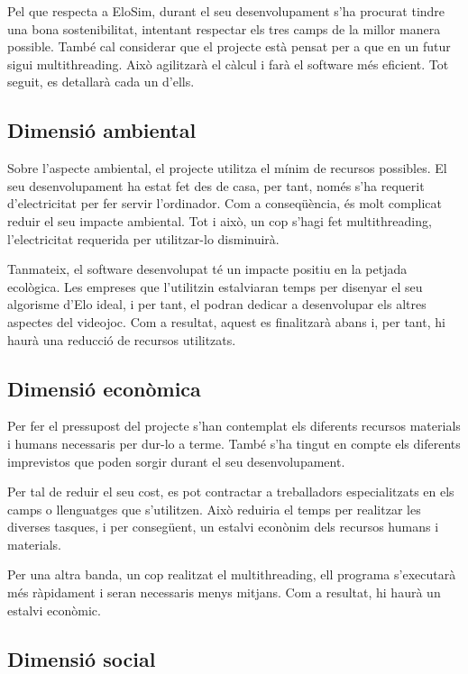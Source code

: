 \documentclass[a4paper]{article}
\begin{document}
Pel que respecta a EloSim, durant el seu desenvolupament s'ha procurat tindre una bona sostenibilitat, intentant respectar els tres camps de la millor manera possible. També cal considerar que el projecte està pensat per a que en un futur sigui multithreading. Això agilitzarà el càlcul i farà el software més eficient. Tot seguit, es detallarà cada un d'ells.

\subsection{Dimensió ambiental}

Sobre l'aspecte ambiental, el projecte utilitza el mínim de recursos possibles. El seu desenvolupament ha estat fet des de casa, per tant, només s'ha requerit d'electricitat per fer servir l'ordinador. Com a conseqüència, és molt complicat reduir el seu impacte ambiental. Tot i això, un cop s'hagi fet multithreading, l'electricitat requerida per utilitzar-lo disminuirà.

Tanmateix, el software desenvolupat té un impacte positiu en la petjada ecològica. Les empreses que l'utilitzin estalviaran temps per disenyar el seu algorisme d'Elo ideal, i per tant, el podran dedicar a desenvolupar els altres aspectes del videojoc. Com a resultat,  aquest es finalitzarà abans i, per tant, hi haurà una reducció de recursos utilitzats.

\subsection{Dimensió econòmica}

Per fer el pressupost del projecte s'han contemplat els diferents recursos materials i humans necessaris per dur-lo a terme. També s'ha tingut en compte els diferents imprevistos que poden sorgir durant el seu desenvolupament.

Per tal de reduir el seu cost, es pot contractar a treballadors especialitzats en els camps o llenguatges que s'utilitzen. Això reduiria el temps per realitzar les diverses tasques, i per consegüent, un estalvi econònim dels recursos humans i materials.

Per una altra banda, un cop realitzat el multithreading, ell programa s'executarà més ràpidament i seran necessaris menys mitjans. Com a resultat, hi haurà un estalvi econòmic.

\subsection{Dimensió social}
\end{document}
